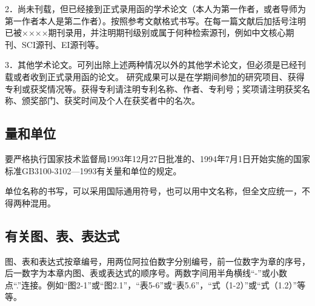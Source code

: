 2．尚未刊载，但已经接到正式录用函的学术论文（本人为第一作者，或者导师为第一作者本人是第二作者）。按照参考文献格式书写。在每一篇文献后加括号注明已被××××期刊录用，并注明期刊级别或属于何种检索源刊，例如中文核心期刊、SCI源刊、EI源刊等。

3．其他学术论文。可列出除上述两种情况以外的其他学术论文，但必须是已经刊载或者收到正式录用函的论文。
研究成果可以是在学期间参加的研究项目、获得专利或获奖情况等。获得专利请注明专利名称、作者、专利号；奖项请注明获奖名称、颁奖部门、获奖时间及个人在获奖者中的名次。

\subsection{量和单位}

要严格执行国家技术监督局1993年12月27日批准的、1994年7月1日开始实施的国家标准GB3100-3102—1993有关量和单位的规定。

单位名称的书写，可以采用国际通用符号，也可以用中文名称，但全文应统一，不得两种混用。

\subsection{有关图、表、表达式}

图、表和表达式按章编号，用两位阿拉伯数字分别编号，前一位数字为章的序号，后一数字为本章内图、表或表达式的顺序号。两数字间用半角横线“-”或小数点“.”连接。例如“图2-1”或“图2.1”，“表5-6”或“表5.6”，“式（1-2）”或“式（1.2）”等等。

